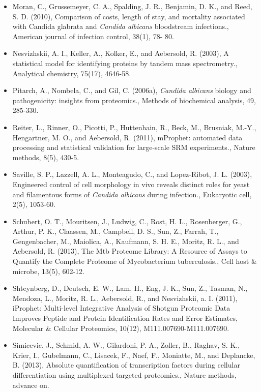 \begin{itemize}[leftmargin=*]
\item[]{
Moran, C., Grussemeyer, C. A., Spalding, J. R., Benjamin, D. K., and Reed, S. D. (2010),
Comparison of costs, length of stay, and mortality associated with Candida glabrata and
\textit{Candida albicans} bloodstream infections., American journal of infection control, 38(1), 78-
80.
}

\item[]{
Nesvizhskii, A. I., Keller, A., Kolker, E., and Aebersold, R. (2003), A statistical model for 
identifying proteins by tandem mass spectrometry., Analytical chemistry, 75(17), 4646-58.
}

\item[]{
Pitarch, A., Nombela, C., and Gil, C. (2006a), \textit{Candida albicans} biology and pathogenicity:
insights from proteomics., Methods of biochemical analysis, 49, 285-330.
}

\item[]{
Reiter, L., Rinner, O., Picotti, P., Huttenhain, R., Beck, M., Brusniak, M.-Y., Hengartner, M. O.,
and Aebersold, R. (2011), mProphet: automated data processing and statistical validation
for large-scale SRM experiments., Nature methods, 8(5), 430-5.
}

\item[]{
Saville, S. P., Lazzell, A. L., Monteagudo, C., and Lopez-Ribot, J. L. (2003), Engineered control
of cell morphology in vivo reveals distinct roles for yeast and filamentous forms of \textit{Candida
albicans} during infection., Eukaryotic cell, 2(5), 1053-60.
}

\item[]{
Schubert, O. T., Mouritsen, J., Ludwig, C., Rost, H. L., Rosenberger, G., Arthur, P. K., Claassen,
M., Campbell, D. S., Sun, Z., Farrah, T., Gengenbacher, M., Maiolica, A., Kaufmann, S. H. E.,
Moritz, R. L., and Aebersold, R. (2013), The Mtb Proteome Library: A Resource of Assays
to Quantify the Complete Proteome of Mycobacterium tuberculosis., Cell host \& microbe,
13(5), 602-12.
}

\item[]{
Shteynberg, D., Deutsch, E. W., Lam, H., Eng, J. K., Sun, Z., Tasman, N., Mendoza, L., Moritz,
R. L., Aebersold, R., and Nesvizhskii, a. I. (2011), iProphet: Multi-level Integrative Analysis
of Shotgun Proteomic Data Improves Peptide and Protein Identification Rates and Error
Estimates, Molecular \& Cellular Proteomics, 10(12), M111.007690-M111.007690.
}

\item[]{
Simicevic, J., Schmid, A. W., Gilardoni, P. A., Zoller, B., Raghav, S. K., Krier, I., Gubelmann,
C., Lisacek, F., Naef, F., Moniatte, M., and Deplancke, B. (2013), Absolute quantification
of transcription factors during cellular differentiation using multiplexed targeted proteomics.,
Nature methods, advance on.
}


\end{itemize}
